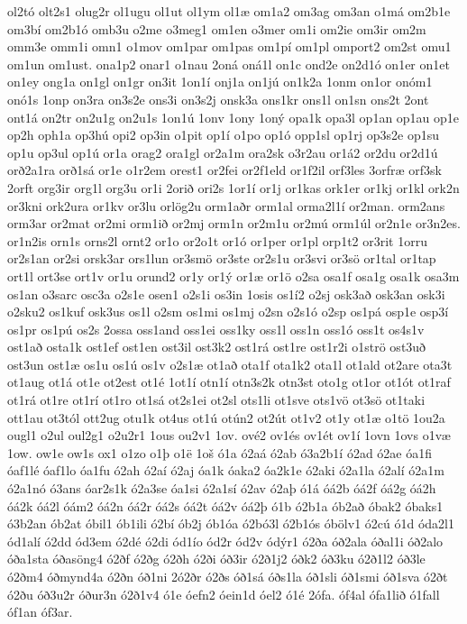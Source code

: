 {ol2tó
olt2s1
olug2r
ol1ugu
ol1ut
ol1ym
ol1æ
om1a2
om3ag
om3an
o1má
om2b1e
om3bí
om2b1ó
omb3u
o2me
o3meg1
om1en
o3mer
om1i
om2ie
om3ir
om2m
omm3e
omm1i
omn1
o1mov
om1par
om1pas
om1pí
om1pl
omport2
om2st
omu1
om1un
om1ust.
ona1p2
onar1
o1nau
2oná
oná1l
on1c
ond2e
on2d1ó
on1er
on1et
on1ey
ong1a
on1gl
on1gr
on3it
1on1í
onj1a
on1jú
on1k2a
1onm
on1or
onóm1
onó1s
1onp
on3ra
on3s2e
ons3i
on3s2j
onsk3a
ons1kr
ons1l
on1sn
ons2t
2ont
ont1á
on2tr
on2u1g
on2u1s
1on1ú
1onv
1ony
1oný
opa1k
opa3l
op1an
op1au
op1e
op2h
oph1a
op3hú
opi2
op3in
o1pit
op1í
o1po
op1ó
opp1sl
op1rj
op3s2e
op1su
op1u
op3ul
op1ú
or1a
orag2
ora1gl
or2a1m
ora2sk
o3r2au
or1á2
or2du
or2d1ú
orð2a1ra
orð1sá
or1e
o1r2em
orest1
or2fei
or2f1eld
or1f2il
orf3les
3orfræ
orf3sk
2orft
org3ir
org1l
org3u
or1i
2orið
ori2s
1or1í
or1j
or1kas
ork1er
or1kj
or1kl
ork2n
or3kni
ork2ura
or1kv
or3lu
orlög2u
orm1aðr
orm1al
orma2l1í
or2man.
orm2ans
orm3ar
or2mat
or2mi
orm1ið
or2mj
orm1n
or2m1u
or2mú
orm1úl
or2n1e
or3n2es.
or1n2is
orn1s
orns2l
ornt2
or1o
or2o1t
or1ó
or1per
or1pl
orp1t2
or3rit
1orru
or2s1an
or2si
orsk3ar
ors1lun
or3smö
or3ste
or2s1u
or3svi
or3sö
or1tal
or1tap
ort1l
ort3se
ort1v
or1u
orund2
or1y
or1ý
or1æ
or1ö
o2sa
osa1f
osa1g
osa1k
osa3m
os1an
o3sarc
osc3a
o2s1e
osen1
o2s1i
os3in
1osis
os1í2
o2sj
osk3að
osk3an
osk3i
o2sku2
os1kuf
osk3us
os1l
o2sm
os1mi
os1mj
o2sn
o2s1ó
o2sp
os1pá
osp1e
osp3í
os1pr
os1pú
os2s
2ossa
oss1and
oss1ei
oss1ky
oss1l
oss1n
oss1ó
oss1t
os4s1v
ost1að
osta1k
ost1ef
ost1en
ost3il
ost3k2
ost1rá
ost1re
ost1r2i
o1strö
ost3uð
ost3un
ost1æ
os1u
os1ú
os1v
o2s1æ
ot1að
ota1f
ota1k2
ota1l
ot1ald
ot2are
ota3t
ot1aug
ot1á
ot1e
ot2est
ot1é
1ot1í
otn1í
otn3s2k
otn3st
oto1g
ot1or
ot1ót
ot1raf
ot1rá
ot1re
ot1rí
ot1ro
ot1sá
ot2s1ei
ot2sl
ots1li
ot1sve
ots1vö
ot3sö
ot1taki
ott1au
ot3tól
ott2ug
otu1k
ot4us
ot1ú
otún2
ot2út
ot1v2
ot1y
ot1æ
o1tö
1ou2a
ougl1
o2ul
oul2g1
o2u2r1
1ous
ou2v1
1ov.
ové2
ov1és
ov1ét
ov1í
1ovn
1ovs
o1væ
1ow.
ow1e
ow1s
ox1
o1zo
o1þ
o1ë
1oš
ó1a
ó2aá
ó2ab
ó3a2b1í
ó2ad
ó2ae
óa1fi
óaf1lé
óaf1lo
óa1fu
ó2ah
ó2aí
ó2aj
óa1k
óaka2
óa2k1e
ó2aki
ó2a1la
ó2alí
ó2a1m
ó2a1nó
ó3ans
óar2s1k
ó2a3se
óa1si
ó2a1sí
ó2av
ó2aþ
ó1á
óá2b
óá2f
óá2g
óá2h
óá2k
óá2l
óám2
óá2n
óá2r
óá2s
óá2t
óá2v
óá2þ
ó1b
ó2b1a
ób2að
óbak2
óbaks1
ó3b2an
ób2at
óbil1
ób1ili
ó2bí
ób2j
ób1óa
ó2bó3l
ó2b1ós
óbölv1
ó2cú
ó1d
óda2l1
ód1alí
ó2dd
ód3em
ó2dé
ó2di
ód1ío
ód2r
ód2v
ódýr1
ó2ða
óð2ala
óðal1i
óð2alo
óða1sta
óðasöng4
ó2ðf
ó2ðg
ó2ðh
ó2ði
óð3ir
ó2ð1j2
óðk2
óð3ku
ó2ð1l2
óð3le
ó2ðm4
óðmynd4a
ó2ðn
óð1ni
2ó2ðr
ó2ðs
óð1sá
óðs1la
óð1sli
óð1smi
óð1sva
ó2ðt
ó2ðu
óð3u2r
óður3n
ó2ð1v4
ó1e
óefn2
óein1d
óel2
ó1é
2ófa.
óf4al
ófa1lið
ó1fall
óf1an
óf3ar.
}
